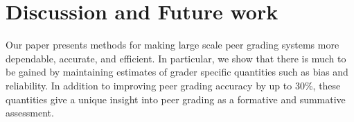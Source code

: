 



\section{Discussion and Future work}
Our paper presents methods for making large scale peer
grading systems more dependable, accurate, and efficient.
In particular, we show that there is much to be gained
by maintaining estimates of grader specific quantities such
as bias and reliability. In addition to improving peer grading
accuracy by up to 30\%, these quantities give a unique insight
into peer grading as a formative and summative assessment.

